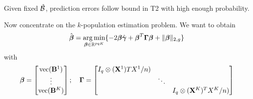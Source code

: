 \documentclass[fleqn,11pt]{article}
\DeclareMathOperator*{\ve}{vec}
\DeclareMathOperator*{\argmin}{arg\,min}
\numberwithin{equation}{section}
\begin{document}
\begin{Proposition}
Given fixed $\hat {{\cal{B}}}$, prediction errors follow bound in T2 with high enough probability.
\end{Proposition}


\hrulefill

Now concentrate on the $k$-population estimation problem. We want to obtain
%
$$
\hat \bfbeta = \argmin_{ \bfbeta \in \BR^{pqK}} \{ -2 \bfbeta \hat \bfgamma + \bfbeta^T \bfGamma \bfbeta + \| \bfbeta \|_{2,g} \}
$$
with
$$
\bfbeta = \begin{bmatrix}
\ve (\bfB^1)\\
\vdots\\
\ve (\bfB^K)\\
\end{bmatrix}; \quad
\bfGamma = \begin{bmatrix}
I_q \otimes (\bfX^1) TX^1 / n) & &\\
& \ddots &\\
& & I_q \otimes (\bfX^K)^T X^K / n)
\end{bmatrix} 
$$
\begin{Theorem}

\end{Theorem}


%

\end{document}
